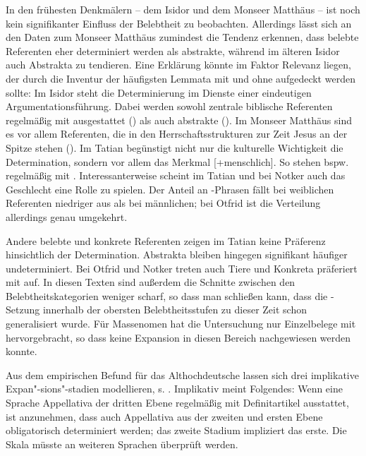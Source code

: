 In den frühesten Denkmälern -- dem Isidor und dem Monseer Matthäus -- ist noch kein signifikanter Einfluss der Belebtheit zu beobachten. Allerdings lässt sich an den Daten zum Monseer Matthäus zumindest die Tendenz erkennen, dass belebte Referenten eher determiniert werden als abstrakte, während im älteren Isidor auch Abstrakta zu  tendieren. Eine Erklärung könnte im Faktor Relevanz liegen, der durch die Inventur der häufigsten Lemmata mit und ohne  aufgedeckt werden sollte:  Im Isidor steht die Determinierung im Dienste einer eindeutigen Argumentationsführung. Dabei werden sowohl zentrale biblische Referenten regelmäßig mit  ausgestattet () als auch abstrakte (). Im Monseer Matthäus sind es vor allem Referenten, die in den Herrschaftsstrukturen zur Zeit Jesus an der Spitze stehen (). Im Tatian begünstigt nicht nur die kulturelle Wichtigkeit die Determination, sondern vor allem das Merkmal [+menschlich]. So stehen bspw.  regelmäßig mit . Interessanterweise scheint im Tatian und bei Notker auch das Geschlecht eine Rolle zu spielen. Der Anteil an -Phrasen fällt bei weiblichen Referenten niedriger aus als bei männlichen; bei Otfrid ist die Verteilung allerdings genau umgekehrt.

Andere belebte und konkrete Referenten zeigen im Tatian keine Präferenz hinsichtlich der Determination. Abstrakta bleiben hingegen signifikant häufiger undeterminiert. Bei Otfrid und Notker treten auch Tiere und Konkreta präferiert mit  auf. In diesen Texten sind außerdem die Schnitte zwischen den Belebtheitskategorien weniger scharf, so dass man schließen kann, dass die -Setzung innerhalb der obersten Belebtheitsstufen zu dieser Zeit schon generalisiert wurde. Für Massenomen hat die Untersuchung nur Einzelbelege mit  hervorgebracht, so dass keine Expansion in diesen Bereich nachgewiesen werden konnte.  

Aus dem empirischen Befund für das Althochdeutsche lassen sich drei implikative Expan"-sions"-stadien modellieren, s. . Implikativ meint Folgendes:  
Wenn eine Sprache Appellativa der dritten Ebene regelmäßig mit Definitartikel ausstattet, ist anzunehmen, dass auch Appellativa aus der zweiten und ersten Ebene obligatorisch determiniert werden; das zweite Stadium impliziert das erste. Die Skala müsste an weiteren Sprachen überprüft werden.  

